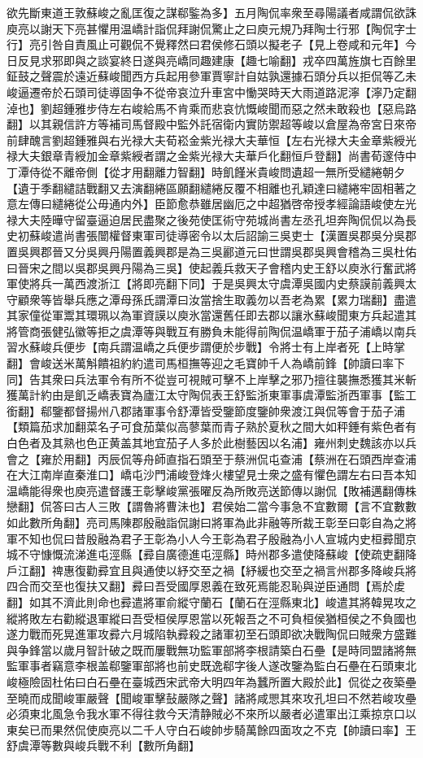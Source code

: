 欲先斷東道王敦蘇峻之亂匡復之謀郗鍳為多】五月陶侃率衆至尋陽議者咸謂侃欲誅庾亮以謝天下亮甚懼用温嶠計詣侃拜謝侃驚止之曰庾元規乃拜陶士行邪【陶侃字士行】亮引咎自責風止可觀侃不覺釋然曰君侯修石頭以擬老子【見上卷咸和元年】今日反見求邪即與之談宴終日遂與亮嶠同趣建康【趣七喻翻】戎卒四萬旌旗七百餘里鉦鼓之聲震於遠近蘇峻聞西方兵起用參軍賈寧計自姑孰還據石頭分兵以拒侃等乙未峻逼遷帝於石頭司徒導固争不從帝哀泣升車宮中慟哭時天大雨道路泥濘【濘乃定翻淖也】劉超鍾雅步侍左右峻給馬不肯乘而悲哀忼慨峻聞而惡之然未敢殺也【惡烏路翻】以其親信許方等補司馬督殿中監外託宿衛内實防禦超等峻以倉屋為帝宮日來帝前肆醜言劉超鍾雅與右光禄大夫荀崧金紫光禄大夫華恒【左右光禄大夫金章紫綬光禄大夫銀章青綬加金章紫綬者謂之金紫光禄大夫華戶化翻恒戶登翻】尚書荀邃侍中丁潭侍從不離帝側【從才用翻離力智翻】時飢饉米貴峻問遺超一無所受繾綣朝夕【遺于季翻繾詰戰翻又去演翻綣區願翻繾綣反覆不相離也孔穎達曰繾綣牢固相著之意左傳曰繾綣從公毋通内外】臣節愈恭雖居幽厄之中超猶啓帝授孝經論語峻使左光禄大夫陸曄守留臺逼迫居民盡聚之後苑使匡術守苑城尚書左丞孔坦奔陶侃侃以為長史初蘇峻遣尚書張闓權督東軍司徒導密令以太后詔諭三吳吏士【漢置吳郡吳分吳郡置吳興郡晉又分吳興丹陽置義興郡是為三吳酈道元曰世謂吳郡吳興會稽為三吳杜佑曰晉宋之間以吳郡吳興丹陽為三吳】使起義兵救天子會稽内史王舒以庾氷行奮武將軍使將兵一萬西渡浙江【將即亮翻下同】于是吳興太守虞潭吳國内史蔡謨前義興太守顧衆等皆舉兵應之潭母孫氏謂潭曰汝當捨生取義勿以吾老為累【累力瑞翻】盡遣其家僮從軍鬻其環珮以為軍資謨以庾氷當還舊任即去郡以讓氷蘇峻聞東方兵起遣其將管商張健弘徽等拒之虞潭等與戰互有勝負未能得前陶侃温嶠軍于茄子浦嶠以南兵習水蘇峻兵便步【南兵謂温嶠之兵便步謂便於步戰】令將士有上岸者死【上時掌翻】會峻送米萬斛饋祖約約遣司馬桓撫等迎之毛寶帥千人為嶠前鋒【帥讀曰率下同】告其衆曰兵法軍令有所不從豈可視賊可擊不上岸擊之邪乃擅往襲撫悉獲其米斬獲萬計約由是飢乏嶠表寶為廬江太守陶侃表王舒監浙東軍事虞潭監浙西軍事【監工銜翻】郗鑒都督揚州八郡諸軍事令舒潭皆受鑒節度鑒帥衆渡江與侃等會于茄子浦【類篇茄求加翻菜名子可食茄葉似高蓼葉而青子熟於夏秋之間大如秤錘有紫色者有白色者及其熟也色正黄盖其地宜茄子人多於此樹藝因以名浦】雍州刺史魏該亦以兵會之【雍於用翻】丙辰侃等舟師直指石頭至于蔡洲侃屯查浦【蔡洲在石頭西岸查浦在大江南岸直秦淮口】嶠屯沙門浦峻登烽火樓望見士衆之盛有懼色謂左右曰吾本知温嶠能得衆也庾亮遣督護王彰擊峻黨張曜反為所敗亮送節傳以謝侃【敗補邁翻傳株戀翻】侃答曰古人三敗【謂魯將曹沬也】君侯始二當今事急不宜數爾【言不宜數數如此數所角翻】亮司馬陳郡殷融詣侃謝曰將軍為此非融等所裁王彰至曰彰自為之將軍不知也侃曰昔殷融為君子王彰為小人今王彰為君子殷融為小人宣城内史桓彛聞京城不守慷慨流涕進屯涇縣【彛自廣德進屯涇縣】時州郡多遣使降蘇峻【使疏吏翻降戶江翻】禆惠復勸彛宜且與通使以紓交至之禍【紓緩也交至之禍言州郡多降峻兵將四合而交至也復扶又翻】彛曰吾受國厚恩義在致死焉能忍恥與逆臣通問【焉於䖍翻】如其不濟此則命也彛遣將軍俞縱守蘭石【蘭石在涇縣東北】峻遣其將韓晃攻之縱將敗左右勸縱退軍縱曰吾受桓侯厚恩當以死報吾之不可負桓侯猶桓侯之不負國也遂力戰而死晃進軍攻彛六月城陷執彛殺之諸軍初至石頭即欲决戰陶侃曰賊衆方盛難與争鋒當以歲月智計破之既而屢戰無功監軍部將李根請築白石壘【是時同盟諸將無監軍事者竊意李根盖郗鑒軍部將也前史既逸郗字後人遂改鑒為監白石壘在石頭東北峻極險固杜佑曰白石壘在臺城西宋武帝大明四年為蠶所置大殿於此】侃從之夜築壘至曉而成聞峻軍嚴聲【聞峻軍擊鼔嚴隊之聲】諸將咸愳其來攻孔坦曰不然若峻攻壘必須東北風急令我水軍不得往救今天清静賊必不來所以嚴者必遣軍出江乘掠京口以東矣已而果然侃使庾亮以二千人守白石峻帥步騎萬餘四面攻之不克【帥讀曰率】王舒虞潭等數與峻兵戰不利【數所角翻】